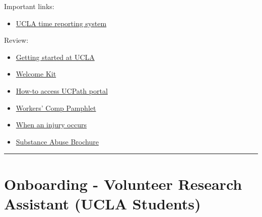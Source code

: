 \documentclass[
]{book}
\providecommand{\tightlist}{%
  \setlength{\itemsep}{0pt}\setlength{\parskip}{0pt}}
\begin{document}
Important links:

\begin{itemize}
\tightlist
\item
  \href{24https://uctrs.it.ucla.edu/}{UCLA time reporting system}
\end{itemize}

Review:

\begin{itemize}
\tightlist
\item
  \href{https://www.chr.ucla.edu/new-employee/getting-started}{Getting started at UCLA}
\item
  \href{https://ucnet.universityofcalifornia.edu/forms/pdf/welcome-kit.pdf}{Welcome Kit}
\item
  \href{https://www.centralresourceunit.ucla.edu/s/}{How-to access UCPath portal}
\item
  \href{https://ucla.app.box.com/s/jyzoag8v9qw6katuvgegjil8an2tsx2j}{Workers' Comp
  Pamphlet}
\item
  \href{https://ucla.app.box.com/s/nua4ypfpjlt1226fusney4zyvo6qzzhj}{When an injury occurs}
\item
  \href{https://ucla.app.box.com/s/qrj4j7bnca1r8fy9n1bdfdf6orf1g0dq}{Substance Abuse Brochure}
\end{itemize}

\begin{center}\rule{0.5\linewidth}{0.5pt}\end{center}

\hypertarget{onboarding---volunteer-research-assistant-ucla-students}{%
\section{Onboarding - Volunteer Research Assistant (UCLA Students)}\label{onboarding---volunteer-research-assistant-ucla-students}}
\end{document}

